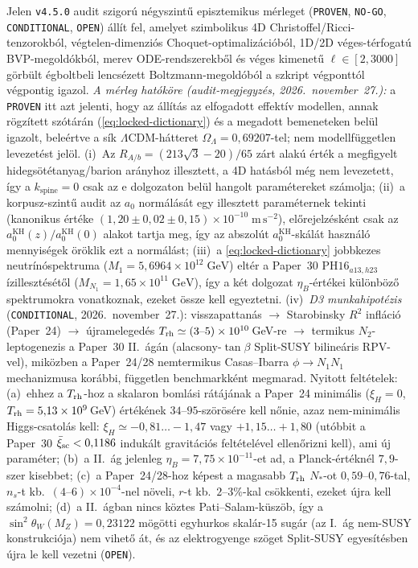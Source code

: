\documentclass[11pt,a4paper]{article}
\begin{document}
Jelen \texttt{v4.5.0} audit szigorú négyszintű episztemikus mérleget ({\upshape\texttt{PROVEN}}, {\upshape\texttt{NO-GO}}, {\upshape\texttt{CONDITIONAL}}, {\upshape\texttt{OPEN}}) állít fel, amelyet szimbolikus 4D Christoffel/Ricci-tenzorokból, végtelen-dimenziós Choquet-optimalizációból, 1D/2D véges-térfogatú BVP-megoldókból, merev ODE-rendszerekből és véges kimenetű $\ell \in [2, 3000]$ görbült égboltbeli lencsézett Boltzmann-megoldóból a  szkript végponttól végpontig igazol. \emph{A mérleg hatóköre (audit-megjegyzés, 2026.~november~27.):} a \texttt{PROVEN} itt azt jelenti, hogy az állítás az elfogadott effektív modellen, annak rögzített szótárán (\eqref{eq:locked-dictionary}) és a megadott bemeneteken belül igazolt, beleértve a sík $\Lambda$CDM-hátteret $\Omega_\Lambda = 0{,}69207$-tel; nem modellfüggetlen levezetést jelöl. (i)~Az $R_{A/b} = (213\sqrt{3}-20)/65$ zárt alakú érték a megfigyelt hidegsötétanyag/barion arányhoz illesztett, a 4D hatásból még nem levezetett, így a $k_{\mathrm{spine}} = 0$ csak az e dolgozaton belül hangolt paramétereket számolja; (ii)~a korpusz-szint\H{u} audit az $a_0$ normálását egy illesztett paraméternek tekinti (kanonikus értéke $(1{,}20\pm 0{,}02\pm 0{,}15)\times 10^{-10}\;\mathrm{m\,s^{-2}}$), el\H{o}rejelzésként csak az $a_0^{\mathrm{KH}}(z)/a_0^{\mathrm{KH}}(0)$ alakot tartja meg, így az abszolút $a_0^{\mathrm{KH}}$-skálát használó mennyiségek öröklik ezt a normálást; (iii)~a \eqref{eq:locked-dictionary} jobbkezes neutrínóspektruma ($M_1 = 5{,}6964\times 10^{12}\;\mathrm{GeV}$) eltér a Paper~30 $\mathrm{PH16}_{a13,h23}$ ízillesztését\H{o}l ($M_{N_1} = 1{,}65\times 10^{11}\;\mathrm{GeV}$), így a két dolgozat $\eta_B$-értékei különböz\H{o} spektrumokra vonatkoznak, ezeket össze kell egyeztetni. (iv)~\emph{D3 munkahipotézis} (\texttt{CONDITIONAL}, 2026.~november~27.): visszapattanás $\to$ Starobinsky $R^2$ infláció (Paper~24) $\to$ újramelegedés $T_{\rm rh}\simeq(3\text{--}5)\times10^{10}$\,GeV-re $\to$ termikus $N_2$-leptogenezis a Paper~30 II.~ágán (alacsony-$\tan\beta$ Split-SUSY bilineáris RPV-vel), miközben a Paper~24/28 nemtermikus Casas--Ibarra $\phi\to N_1N_1$ mechanizmusa korábbi, független benchmarkként megmarad. Nyitott feltételek: (a)~ehhez a $T_{\rm rh}$-hoz a skalaron bomlási rátájának a Paper~24 minimális ($\xi_H=0$, $T_{\rm rh}=5{,}13\times10^{9}$\,GeV) értékének $34$--$95$-szörösére kell n\H{o}nie, azaz nem-minimális Higgs-csatolás kell: $\xi_H\simeq-0{,}81\ldots-1{,}47$ vagy $+1{,}15\ldots+1{,}80$ (utóbbit a Paper~30 $\bar\xi_{\rm sc}<0{,}1186$ indukált gravitációs feltételével ellen\H{o}rizni kell), ami új paraméter; (b)~a II.~ág jelenleg $\eta_B=7{,}75\times10^{-11}$-et ad, a Planck-értéknél $7{,}9$-szer kisebbet; (c)~a Paper~24/28-hoz képest a magasabb $T_{\rm rh}$ $N_*$-ot $0{,}59$--$0{,}76$-tal, $n_s$-t kb.\ $(4\text{--}6)\times10^{-4}$-nel növeli, $r$-t kb.\ $2$--$3\%$-kal csökkenti, ezeket újra kell számolni; (d)~a II.~ágban nincs köztes Pati--Salam-küszöb, így a $\sin^2\theta_W(M_Z)=0{,}23122$ mögötti egyhurkos skalár-15 sugár (az I.~ág nem-SUSY konstrukciója) nem vihet\H{o} át, és az elektrogyenge szöget Split-SUSY egyesítésben újra le kell vezetni (\texttt{OPEN}).
\end{document}
